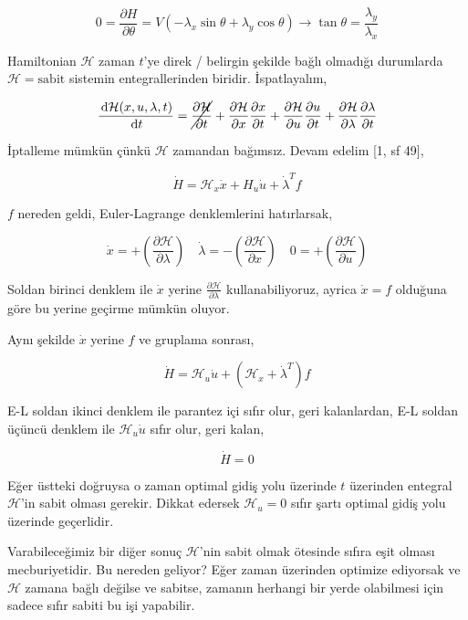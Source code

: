 \documentclass[12pt,fleqn]{article}\usepackage{../../common}
\begin{document}
$$
0 = \frac{\partial H}{\partial \theta}  = 
V (-\lambda_x \sin \theta + \lambda_y \cos \theta ) \to
\tan\theta = \frac{\lambda_y}{\lambda_x}
$$

Hamiltonian $\mathcal{H}$ zaman $t$'ye direk / belirgin şekilde bağlı
olmadığı durumlarda $\mathcal{H} = \textrm{sabit}$ sistemin
entegrallerinden biridir. İspatlayalım,

$$
\frac{\,\mathrm{d} \mathcal{H}(x, u, \lambda, t)}{\,\mathrm{d} t} = 
\cancel{\frac{\partial \mathcal{H}}{\partial t}} + 
\frac{\partial \mathcal{H}}{\partial x}\frac{\partial x}{\partial t} + 
\frac{\partial \mathcal{H}}{\partial u}\frac{\partial u}{\partial t} + 
\frac{\partial \mathcal{H}}{\partial \lambda}\frac{\partial \lambda}{\partial t} 
$$

İptalleme mümkün çünkü $\mathcal{H}$ zamandan bağımsız. Devam edelim [1, sf 49],

$$
\dot{H} = \mathcal{H}_x \dot{x} + H_u \dot{u} + \dot{\lambda}^T f
$$

$f$ nereden geldi, Euler-Lagrange denklemlerini hatırlarsak,

$$
\dot{x} = + \left( \frac{\partial \mathcal{H}}{\partial \lambda} \right)
\quad
\dot{\lambda} = - \left( \frac{\partial \mathcal{H}}{\partial x} \right)
\quad
0 = + \left( \frac{\partial \mathcal{H}}{\partial u} \right)
$$

Soldan birinci denklem ile $\dot{x}$ yerine $\frac{\partial
\mathcal{H}}{\partial \lambda}$ kullanabiliyoruz, ayrica $\dot{x} = f$
olduğuna göre bu yerine geçirme mümkün oluyor. 

Aynı şekilde $\dot{x}$ yerine $f$ ve gruplama sonrası,

$$
\dot{H} = \mathcal{H}_u \dot{u} + (\mathcal{H}_x + \dot{\lambda}^T) f
$$

E-L soldan ikinci denklem ile parantez içi sıfır olur, geri kalanlardan,
E-L soldan üçüncü denklem ile $\mathcal{H}_u \dot{u}$ sıfır olur, geri
kalan,

$$
\dot{H} = 0
$$

Eğer üstteki doğruysa o zaman optimal gidiş yolu üzerinde $t$
üzerinden entegral $\mathcal{H}$'in sabit olması gerekir. Dikkat
edersek $\mathcal{H}_u = 0$ sıfır şartı optimal gidiş yolu üzerinde
geçerlidir. 

Varabileceğimiz bir diğer sonuç $\mathcal{H}$'nin sabit olmak ötesinde
sıfıra eşit olması mecburiyetidir. Bu nereden geliyor? Eğer zaman
üzerinden optimize ediyorsak ve $\mathcal{H}$ zamana bağlı değilse ve
sabitse, zamanın herhangi bir yerde olabilmesi için sadece sıfır
sabiti bu işi yapabilir.
\end{document}
